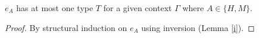 \begin{lemma}
\label{uot}
$e_{A}$ has at most one type $T$ for a given context $\Gamma$ where $A\in\lbrace H,M\rbrace$.
\begin{proof}
By structural induction on $e_{A}$ using inversion (Lemma \ref{i}).
\end{proof}
\end{lemma}